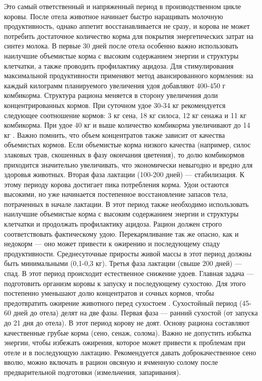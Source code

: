 Это самый ответственный и напряженный период в производственном цикле коровы. После отела животное начинает быстро наращивать молочную продуктивность, однако аппетит восстанавливается не сразу, и корова не может потребить достаточное количество корма для покрытия энергетических затрат на синтез молока.
В первые 30 дней после отела особенно важно использовать наилучшие объемистые корма с высоким содержанием энергии и структуры клетчатки, а также проводить профилактику ацидоза. Для стимулирования максимальной продуктивности применяют метод авансированного кормления: на каждый килограмм планируемого увеличения удоя добавляют 400-450 г комбикорма. Структура рациона меняется в сторону увеличения доли концентрированных кормов. При суточном удое 30-34 кг рекомендуется следующее соотношение кормов: 3 кг сена, 18 кг силоса, 12 кг сенажа и 11 кг комбикорма. При удое 40 кг и выше количество комбикорма увеличивают до 14 кг .
Важно помнить, что объем концентратов также зависит от качества объемистых кормов. Если объемистые корма низкого качества (например, силос злаковых трав, скошенных в фазу окончания цветения), то долю комбикормов приходится значительно увеличивать, что экономически невыгодно и вредно для здоровья животных. 
Вторая фаза лактации (100-200 дней) --- стабилизация.
К этому периоду корова достигает пика потребления корма. Удои остаются высокими, но уже начинается постепенное восстановление запасов тела, потраченных в начале лактации. В этот период также необходимо использовать наилучшие объемистые корма с высоким содержанием энергии и структуры клетчатки и продолжать профилактику ацидоза.
Рацион должен строго соответствовать фактическому удою. Перекармливание так же опасно, как и недокорм --- оно может привести к ожирению и последующему спаду продуктивности. Среднесуточные приросты живой массы в этот период должны быть минимальными (0,1-0,3 кг).
Третья фаза лактации (свыше 200 дней) --- спад.
В этот период происходит естественное снижение удоев. Главная задача — подготовить организм коровы к запуску и последующему сухостою. Для этого постепенно уменьшают долю концентратов и сочных кормов, чтобы предотвратить ожирение животного перед сухостоем .
Сухостойный период (45-60 дней до отела) делят на две фазы.
Первая фаза --- ранний сухостой (от запуска до 21 дня до отела). В этот период корову не доят. Основу рациона составляют качественные грубые корма (сено, сенаж, солома). Важно не допустить избытка энергии, чтобы избежать ожирения, которое может привести к проблемам при отеле и в последующую лактацию. Рекомендуется давать доброкачественное сено вволю, можно включать в рацион овсяную и ячменную солому после предварительной подготовки (измельчения, запаривания).
